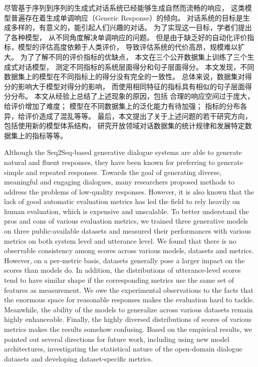 \begin{cabstract}
    尽管基于序列到序列的生成式对话系统已经能够生成自然而流畅的响应，
    这类模型普遍存在着生成单调响应（Generic Response）的倾向。
    对话系统的目标是生成多样的，有意义的，能引起人们兴趣的对话。
    为了实现这一目标，学者们提出了各种模型，
    从不同角度解决单调响应的问题。
    但是由于缺乏好的自动化评价指标，模型的评估高度依赖于人类评价，
    导致评估系统的代价高昂，规模难以扩大。
    为了了解不同的评价指标的优缺点，
    本文在三个公开数据集上训练了三个生成式对话模型，
    测定不同指标的系统层面得分和句子层面得分。
    本文发现，不同数据集上的模型在不同指标上的得分没有完全的一致性。
    总体来说，数据集对得分的影响大于模型对得分的影响，
    而使用相同特征的指标具有相似的句子层面得分分布。
    本文从经验上总结了上述现象的原因，包括
    合理的响应空间过于庞大，给评价增加了难度；
    模型在不同数据集上的泛化能力有待加强；
    指标的分布各异，给评价造成了混乱等等。
    最后，本文提出了关于上述问题的若干研究方向，
    包括使用新的模型体系结构，
    研究开放领域对话数据集的统计规律和发展特定数据集上的指标等等。
\end{cabstract}

\begin{eabstract}
    Although the Seq2Seq-based generative dialogue systems are
    able to generate natural and
    fluent responses,
    they have been known for preferring to generate
    simple and repeated responses.
    Towards the goal of generating diverse, meaningful and
    engaging dialogues,
    many researchers proposed methods to address the
    problems of low-quality responses.
    However, it is also known that the
    lack of good automatic evaluation metrics
    has led the field to rely heavily on human evaluation,
    which is expensive and unscalable.
    To better understand the pros and cons of various
    evaluation metrics,
    we trained three generative models on
    three public-available datasets and measured their
    performances with various metrics on both system level
    and utterance level.
    We found that there is no observable consistency among scores
    across various models, datasets and metrics.
    However, on a per-metric basis, datasets generally pose a larger impact on
    the scores than models do.
    In addition, the distributions of
    utterance-level scores tend to have similar shape if the corresponding metrics
    use the same set of features as measurement.
    We owe the experimental observations to the facts
    that the enormous space for reasonable responses
    makes the evaluation hard to tackle.
    Meanwhile, the ability of the models to generalize across
    various datasets remain highly enhanceable.
    Finally, the highly diversed distributions of scores
    of various metrics makes the results somehow confusing.
    Based on the empirical results, we pointed out several
    directions for future work, including using new model
    architectures, investigating the statistical nature of
    the open-domain dialogue datasets and
    developing dataset-specific metrics.
\end{eabstract}
